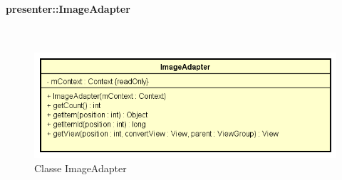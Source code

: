 \documentclass[../DefinizioneDiProdotto.tex]{subfiles}
\begin{document}
\paragraph{presenter::ImageAdapter}
\
\begin{figure}[H]
	\centering
	\includegraphics[width=\maxwidth]{img/ImageAdapter.png}
	\caption{Classe ImageAdapter}\label{fig:presenter::ImageAdapter} 
\end{figure}
\end{document}
